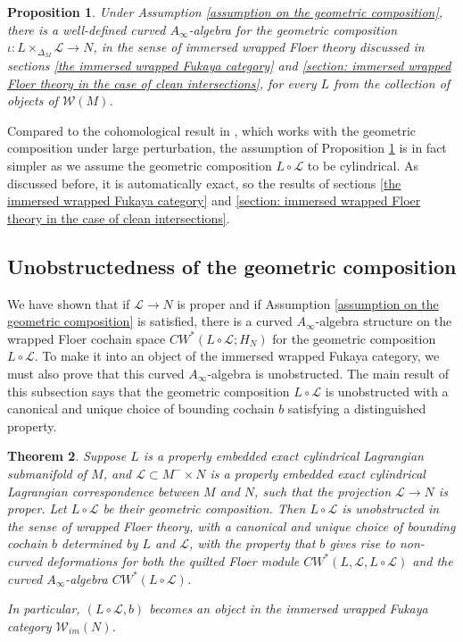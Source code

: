 \documentclass{amsart}
\newtheorem{theorem}{Theorem}[section]
\newtheorem{proposition}[theorem]{Proposition}
\numberwithin{equation}{section}
\numberwithin{figure}{section}
\begin{document}
\begin{proposition}\label{prop: geometric composition is admissible}
	Under Assumption \ref{assumption on the geometric composition}, there is a well-defined curved $A_{\infty}$-algebra for the geometric composition $\iota: L \times_{\Delta_{M}} \mathcal{L} \to N$, in the sense of immersed wrapped Floer theory discussed in sections \ref{the immersed wrapped Fukaya category} and \ref{section: immersed wrapped Floer theory in the case of clean intersections}, for every $L$ from the collection of objects of $\mathcal{W}(M)$.
\end{proposition}

	Compared to the cohomological result in \cite{Gao1}, which works with the geometric composition under large perturbation, the assumption of Proposition \ref{prop: geometric composition is admissible} is in fact simpler as we assume the geometric composition $L \circ \mathcal{L}$ to be cylindrical. As discussed before, it is automatically exact, so the results of sections \ref{the immersed wrapped Fukaya category} and \ref{section: immersed wrapped Floer theory in the case of clean intersections}. \par

\subsection{Unobstructedness of the geometric composition}\label{section: unobstructedness of the geometric composition}
	We have shown that if $\mathcal{L} \to N$ is proper and if Assumption \ref{assumption on the geometric composition} is satisfied, there is a curved $A_{\infty}$-algebra structure on the wrapped Floer cochain space $CW^{*}(L \circ \mathcal{L}; H_{N})$ for the geometric composition $L \circ \mathcal{L}$.
To make it into an object of the immersed wrapped Fukaya category, we must also prove that this curved $A_{\infty}$-algebra is unobstructed.
The main result of this subsection says that the geometric composition $L \circ \mathcal{L}$ is unobstructed with a canonical and unique choice of bounding cochain $b$ satisfying a distinguished property. \par

\begin{theorem} \label{unobstructedness of geometric composition}
	Suppose $L$ is a properly embedded exact cylindrical Lagrangian submanifold of $M$, and $\mathcal{L} \subset M^{-} \times N$ is a properly embedded exact cylindrical Lagrangian correspondence between $M$ and $N$, such that the projection $\mathcal{L} \to N$ is proper. Let $L \circ \mathcal{L}$ be their geometric composition. 
Then $L \circ \mathcal{L}$ is unobstructed in the sense of wrapped Floer theory, with a canonical and unique choice of bounding cochain $b$ determined by $L$ and $\mathcal{L}$, with the property that $b$ gives rise to non-curved deformations for both the quilted Floer module $CW^{*}(L, \mathcal{L}, L \circ \mathcal{L})$ and the curved $A_{\infty}$-algebra $CW^{*}(L \circ \mathcal{L})$. \par
	In particular, $(L \circ \mathcal{L}, b)$ becomes an object in the immersed wrapped Fukaya category $\mathcal{W}_{im}(N)$.
\end{theorem}
\end{document}
